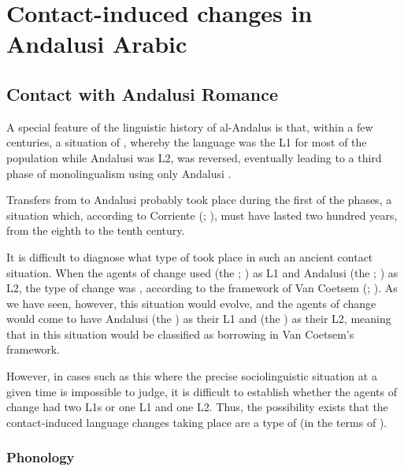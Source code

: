 \documentclass[output=paper,modfonts,nonflat]{langsci/langscibook}
\begin{document}
\section{Contact-induced changes in Andalusi Arabic} 

\subsection{Contact with Andalusi Romance}

A special feature of the linguistic history of al-Andalus is that, within a few centuries, a situation of , whereby the  language was the L1 for most of the population while Andalusi  was L2, was reversed, eventually leading to a third phase of monolingualism using only Andalusi . 

Transfers from  to Andalusi  probably took place during the first of the  phases, a situation which, according to Corriente (\citeyear{Corriente2005};  \citeyear{Corriente2008}), must have lasted two hundred years, from the eighth to the tenth century. 

It is difficult to diagnose what type of  took place in such an ancient contact situation. When the agents of change used  (the ; ) as L1 and Andalusi  (the ; ) as L2, the type of change was , according to the framework of Van Coetsem (\citeyear{VanCoetsem1988}; \citeyear{VanCoetsem2000}). As we have seen, however, this situation would evolve, and the agents of change would come to have Andalusi  (the ) as their L1 and  (the ) as their L2, meaning that  in this situation would be classified as borrowing in Van Coetsem’s framework. 

However, in cases such as this where the precise sociolinguistic situation at a given time is impossible to judge, it is difficult to establish whether the agents of change had two L1s or one L1 and one L2. Thus, the possibility exists that the contact-induced language changes taking place are a  type of  (in the terms of \citealt{Lucas2015}). 




\subsubsection{\label{bkm:Ref12959774}Phonology}\largerpage[2]
\end{document}

